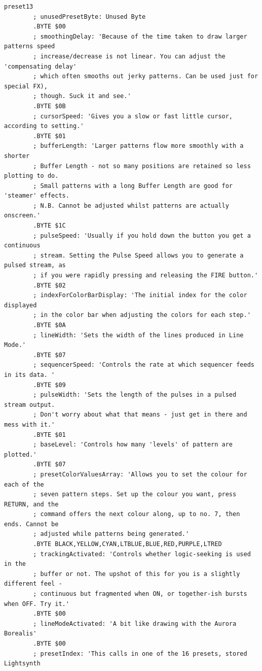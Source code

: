 \begin{lstlisting}[basicstyle=\ttfamily\tiny,caption=Source code for Preset 13.]
preset13
        ; unusedPresetByte: Unused Byte
        .BYTE $00
        ; smoothingDelay: 'Because of the time taken to draw larger patterns speed
        ; increase/decrease is not linear. You can adjust the 'compensating delay'
        ; which often smooths out jerky patterns. Can be used just for special FX),
        ; though. Suck it and see.'
        .BYTE $0B
        ; cursorSpeed: 'Gives you a slow or fast little cursor, according to setting.'
        .BYTE $01
        ; bufferLength: 'Larger patterns flow more smoothly with a shorter
        ; Buffer Length - not so many positions are retained so less plotting to do.
        ; Small patterns with a long Buffer Length are good for 'steamer' effects.
        ; N.B. Cannot be adjusted whilst patterns are actually onscreen.'
        .BYTE $1C
        ; pulseSpeed: 'Usually if you hold down the button you get a continuous
        ; stream. Setting the Pulse Speed allows you to generate a pulsed stream, as
        ; if you were rapidly pressing and releasing the FIRE button.'
        .BYTE $02
        ; indexForColorBarDisplay: 'The initial index for the color displayed
        ; in the color bar when adjusting the colors for each step.'
        .BYTE $0A
        ; lineWidth: 'Sets the width of the lines produced in Line Mode.'
        .BYTE $07
        ; sequencerSpeed: 'Controls the rate at which sequencer feeds in its data. '
        .BYTE $09
        ; pulseWidth: 'Sets the length of the pulses in a pulsed stream output.
        ; Don't worry about what that means - just get in there and mess with it.'
        .BYTE $01
        ; baseLevel: 'Controls how many 'levels' of pattern are plotted.'
        .BYTE $07
        ; presetColorValuesArray: 'Allows you to set the colour for each of the
        ; seven pattern steps. Set up the colour you want, press RETURN, and the
        ; command offers the next colour along, up to no. 7, then ends. Cannot be
        ; adjusted while patterns being generated.'
        .BYTE BLACK,YELLOW,CYAN,LTBLUE,BLUE,RED,PURPLE,LTRED
        ; trackingActivated: 'Controls whether logic-seeking is used in the
        ; buffer or not. The upshot of this for you is a slightly different feel -
        ; continuous but fragmented when ON, or together-ish bursts when OFF. Try it.'
        .BYTE $00
        ; lineModeActivated: 'A bit like drawing with the Aurora Borealis'
        .BYTE $00
        ; presetIndex: 'This calls in one of the 16 presets, stored Lightsynth

\end{lstlisting}
